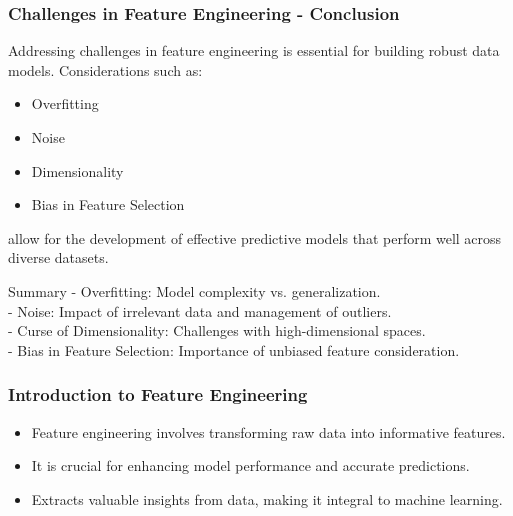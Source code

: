 \documentclass[aspectratio=169]{beamer}
\begin{document}
\begin{frame}[fragile]
    \frametitle{Challenges in Feature Engineering - Conclusion}
    
    Addressing challenges in feature engineering is essential for building robust data models. Considerations such as:
    \begin{itemize}
        \item Overfitting
        \item Noise
        \item Dimensionality
        \item Bias in Feature Selection
    \end{itemize}
    
    allow for the development of effective predictive models that perform well across diverse datasets. 

    \begin{block}{Summary}
        - Overfitting: Model complexity vs. generalization. \\
        - Noise: Impact of irrelevant data and management of outliers. \\
        - Curse of Dimensionality: Challenges with high-dimensional spaces. \\
        - Bias in Feature Selection: Importance of unbiased feature consideration.
    \end{block}
\end{frame}

\begin{frame}[fragile]
    \frametitle{Introduction to Feature Engineering}
    \begin{itemize}
        \item Feature engineering involves transforming raw data into informative features.
        \item It is crucial for enhancing model performance and accurate predictions.
        \item Extracts valuable insights from data, making it integral to machine learning.
    \end{itemize}
\end{frame}
\end{document}
